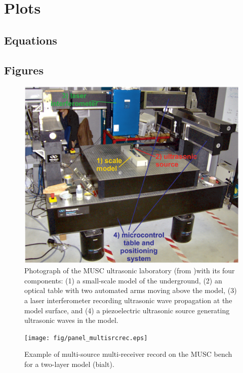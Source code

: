 \documentclass[manuscript,revised]{geophysics}
\begin{document}
\section{Plots}

\subsection*{Equations}

\subsection*{Figures}

\begin{figure}[!h]
	\centering
	\includegraphics[scale=0.4]{fig/panel_musc_bench.eps}
	\caption{Photograph of the MUSC ultrasonic laboratory (from \citet{Bretaudeau_FWI_2013} )with its four components: (1) a small-scale model of the underground, (2) an optical table with two automated arms moving above the model, (3) a laser interferometer recording ultrasonic wave propagation	at the model surface, and (4) a piezoelectric ultrasonic source generating ultrasonic waves in the model.}
	\label{panel_musc_bench}
\end{figure}

\begin{figure}[!h]
	\centering
	\texttt{[image: fig/panel\_multisrcrec.eps]}
	\caption{Example of multi-source multi-receiver record on the MUSC bench for a two-layer model (bialt).}
	\label{panel_multisrcrec}
\end{figure}
\end{document}
